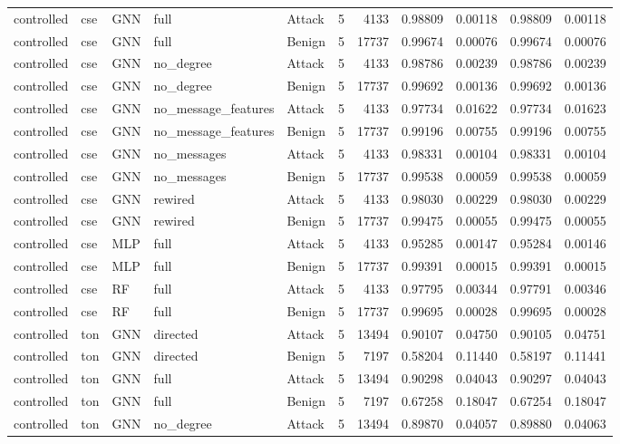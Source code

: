 \begin{tabular}{lllllrrrrrr}
controlled & cse & GNN & full & Attack & 5 & 4133 & 0.98809 & 0.00118 & 0.98809 & 0.00118 \\
controlled & cse & GNN & full & Benign & 5 & 17737 & 0.99674 & 0.00076 & 0.99674 & 0.00076 \\
controlled & cse & GNN & no_degree & Attack & 5 & 4133 & 0.98786 & 0.00239 & 0.98786 & 0.00239 \\
controlled & cse & GNN & no_degree & Benign & 5 & 17737 & 0.99692 & 0.00136 & 0.99692 & 0.00136 \\
controlled & cse & GNN & no_message_features & Attack & 5 & 4133 & 0.97734 & 0.01622 & 0.97734 & 0.01623 \\
controlled & cse & GNN & no_message_features & Benign & 5 & 17737 & 0.99196 & 0.00755 & 0.99196 & 0.00755 \\
controlled & cse & GNN & no_messages & Attack & 5 & 4133 & 0.98331 & 0.00104 & 0.98331 & 0.00104 \\
controlled & cse & GNN & no_messages & Benign & 5 & 17737 & 0.99538 & 0.00059 & 0.99538 & 0.00059 \\
controlled & cse & GNN & rewired & Attack & 5 & 4133 & 0.98030 & 0.00229 & 0.98030 & 0.00229 \\
controlled & cse & GNN & rewired & Benign & 5 & 17737 & 0.99475 & 0.00055 & 0.99475 & 0.00055 \\
controlled & cse & MLP & full & Attack & 5 & 4133 & 0.95285 & 0.00147 & 0.95284 & 0.00146 \\
controlled & cse & MLP & full & Benign & 5 & 17737 & 0.99391 & 0.00015 & 0.99391 & 0.00015 \\
controlled & cse & RF & full & Attack & 5 & 4133 & 0.97795 & 0.00344 & 0.97791 & 0.00346 \\
controlled & cse & RF & full & Benign & 5 & 17737 & 0.99695 & 0.00028 & 0.99695 & 0.00028 \\
controlled & ton & GNN & directed & Attack & 5 & 13494 & 0.90107 & 0.04750 & 0.90105 & 0.04751 \\
controlled & ton & GNN & directed & Benign & 5 & 7197 & 0.58204 & 0.11440 & 0.58197 & 0.11441 \\
controlled & ton & GNN & full & Attack & 5 & 13494 & 0.90298 & 0.04043 & 0.90297 & 0.04043 \\
controlled & ton & GNN & full & Benign & 5 & 7197 & 0.67258 & 0.18047 & 0.67254 & 0.18047 \\
controlled & ton & GNN & no_degree & Attack & 5 & 13494 & 0.89870 & 0.04057 & 0.89880 & 0.04063 \\

\end{tabular}
